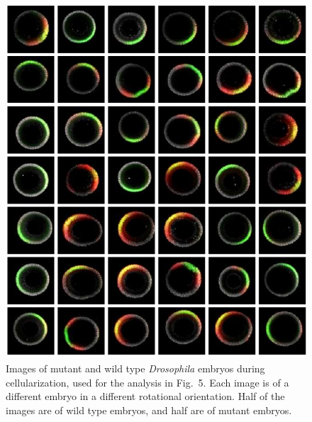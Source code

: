 \documentclass{pnastwo}
\newcommand{\fig}[0]{Fig.}
\begin{document}
\begin{figure}
\includegraphics{figS3}
\caption{Images of mutant and wild type {\it Drosophila} embryos during cellularization, used for the analysis in \fig~5. Each image is of a different embryo in a different rotational orientation. Half of the images are of wild type embryos, and half are of mutant embryos.}
\end{figure}
\end{document}
